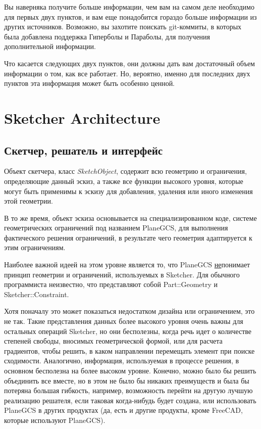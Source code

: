 \documentclass[12pt,twoside,a4paper]{book}
\newcommand{\SketchObject}{\emph{SketchObject}}
\newenvironment{tolerant}[1]{%
  \par\tolerance=#1\relax
}{%
  \par
}
\begin{document}
    Вы наверняка получите больше информации, чем вам на самом деле необходимо для первых двух пунктов, и вам еще понадобится гораздо больше информации из других источников. Возможно, вы захотите поискать git-коммиты, в которых была добавлена поддержка Гиперболы и Параболы, для получения дополнительной информации.

    Что касается следующих двух пунктов, они должны дать вам достаточный объем информации о том, как все работает. Но, вероятно, именно для последних двух пунктов эта информация может быть особенно ценной.

    \chapter{Sketcher Architecture}

    \section{Скетчер, решатель и интерфейс}

    Объект скетчера, класс \SketchObject{}, содержит всю геометрию и ограничения, определяющие данный эскиз, а также все функции высокого уровня, которые могут быть применимы к эскизу для добавления, удаления или иного изменения этой геометрии.

    В то же время, объект эскиза основывается на специализированном коде, системе геометрических ограничений под названием PlaneGCS, для выполнения фактического решения ограничений, в результате чего геометрия адаптируется к этим ограничениям.

    \begin{tolerant}{500}
    Наиболее важной идеей на этом уровне является то, что PlaneGCS \underline{не}понимает принцип геометрии и ограничений, используемых в Sketcher. Для обычного программиста неизвестно, что представляют собой Part::Geometry и Sketcher::Constraint.
    \end{tolerant}

    Хотя поначалу это может показаться недостатком дизайна или ограничением, это не так. Такие представления данных более высокого уровня очень важны для остальных операций Sketcher, но они бесполезны, когда речь идет о количестве степеней свободы, вносимых геометрической формой, или для расчета градиентов, чтобы решить, в каком направлении перемещать элемент при поиске сходимости. Аналогично, информация, используемая в процессе решения, в основном бесполезна на более высоком уровне. Конечно, можно было бы решить объединить все вместе, но в этом не было бы никаких преимуществ и была бы потеряна большая гибкость, например, возможность перейти на другую лучшую реализацию решателя, если таковая когда-нибудь будет создана, или использовать PlaneGCS в других продуктах (да, есть и другие продукты, кроме FreeCAD, которые используют PlaneGCS).
\end{document}

